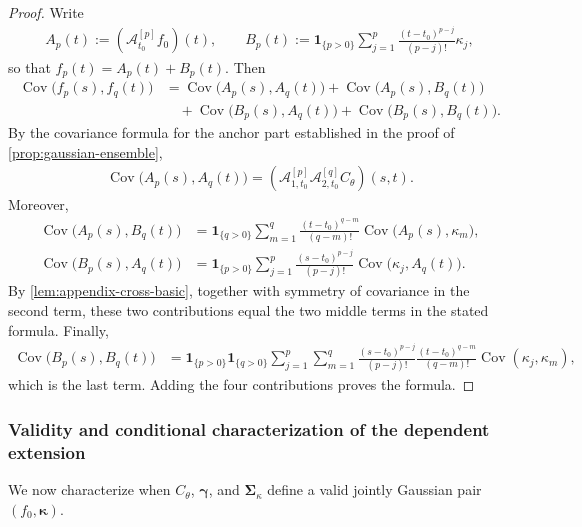 \documentclass[11pt,a4paper]{article}
\theoremstyle{definition}
\theoremstyle{remark}
\DeclareMathOperator{\Cov}{Cov}
\begin{document}
\begin{proof}
Write
\begin{align*}
A_p(t):=(\mathcal A_{t_0}^{[p]}f_0)(t),
\qquad
B_p(t):=\mathbf{1}_{\{p>0\}}\sum_{j=1}^{p}\frac{(t-t_0)^{p-j}}{(p-j)!}\kappa_j,
\end{align*}
so that $f_p(t)=A_p(t)+B_p(t)$. Then
\begin{align*}
\Cov\bigl(f_p(s),f_q(t)\bigr)
&=\Cov\bigl(A_p(s),A_q(t)\bigr)+\Cov\bigl(A_p(s),B_q(t)\bigr)\\
&\quad+\Cov\bigl(B_p(s),A_q(t)\bigr)+\Cov\bigl(B_p(s),B_q(t)\bigr).
\end{align*}
By the covariance formula for the anchor part established in the proof of \cref{prop:gaussian-ensemble},
\begin{align*}
\Cov\bigl(A_p(s),A_q(t)\bigr)=(\mathcal A_{1,t_0}^{[p]}\mathcal A_{2,t_0}^{[q]}C_\theta)(s,t).
\end{align*}
Moreover,
\begin{align*}
\Cov\bigl(A_p(s),B_q(t)\bigr)
&=\mathbf{1}_{\{q>0\}}\sum_{m=1}^{q}\frac{(t-t_0)^{q-m}}{(q-m)!}\Cov\bigl(A_p(s),\kappa_m\bigr),\\
\Cov\bigl(B_p(s),A_q(t)\bigr)
&=\mathbf{1}_{\{p>0\}}\sum_{j=1}^{p}\frac{(s-t_0)^{p-j}}{(p-j)!}\Cov\bigl(\kappa_j,A_q(t)\bigr).
\end{align*}
By \cref{lem:appendix-cross-basic}, together with symmetry of covariance in the second term, these two contributions equal the two middle terms in the stated formula. Finally,
\begin{align*}
\Cov\bigl(B_p(s),B_q(t)\bigr)
&=\mathbf{1}_{\{p>0\}}\mathbf{1}_{\{q>0\}}\sum_{j=1}^{p}\sum_{m=1}^{q}
\frac{(s-t_0)^{p-j}}{(p-j)!}\frac{(t-t_0)^{q-m}}{(q-m)!}\Cov(\kappa_j,\kappa_m),
\end{align*}
which is the last term. Adding the four contributions proves the formula.
\end{proof}




\subsubsection{Validity and conditional characterization of the dependent extension}
We now characterize when \(C_\theta\), \(\boldsymbol{\gamma}\), and \(\boldsymbol{\Sigma}_{\kappa}\) define a valid jointly Gaussian pair \((f_0,\boldsymbol{\kappa})\).
\end{document}
